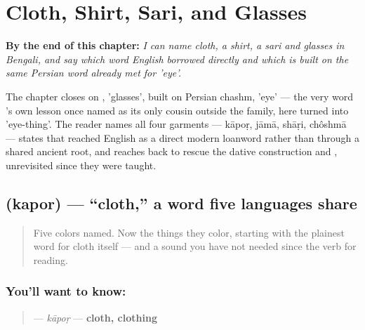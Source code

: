 
\chapter{Cloth, Shirt, Sari, and Glasses}
\label{ch:bn-cloth-shirt-sari-glasses}

\begin{chapteropening}
\textbf{By the end of this chapter:} \emph{I can name cloth, a shirt, a sari and glasses in Bengali, and say which word English borrowed directly and which is built on the same Persian word already met for 'eye'.}

The chapter closes on , 'glasses', built on Persian chashm, 'eye' — the very word 's own lesson once named as its only cousin outside the family, here turned into 'eye-thing'. The reader names all four garments — kāpoṛ, jāmā, shāṛi, chôshmā — states that  reached English as a direct modern loanword rather than through a shared ancient root, and reaches back to rescue the dative construction and , unrevisited since they were taught.
\end{chapteropening}

\section[\texorpdfstring{\bn{কাপড়} (kapor)}{কাপড় (kapor)}]{ (kapor) — \textquotedblleft{}cloth,\textquotedblright{} a word five languages share}

\label{lesson:BN-C15-kapor}



\begin{quote}
Five colors named. Now the things they color, starting with the plainest word for cloth itself — and a sound you have not needed since the verb for reading.
\end{quote}

\subsection*{You'll want to know: }
\begin{quote}
\textbf{} — \emph{kāpoṛ} — \textbf{cloth, clothing}
\end{quote}

